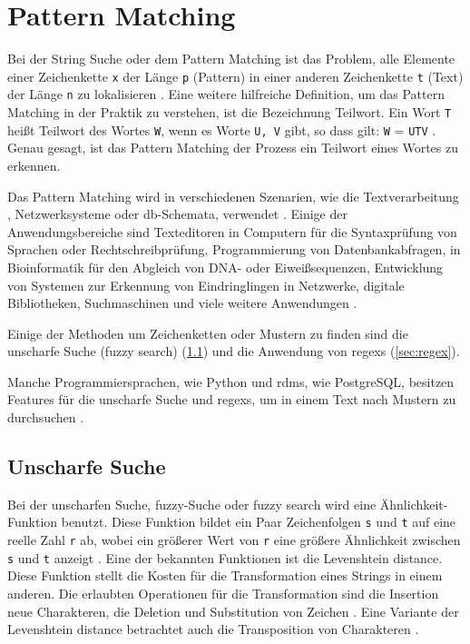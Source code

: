 \section{Pattern Matching} \label{subsec:pattmatch}

Bei der String Suche oder dem Pattern Matching ist das Problem, alle Elemente einer Zeichenkette \texttt{x} der Länge \texttt{p} (Pattern) in einer anderen Zeichenkette \texttt{t} (Text) der Länge \texttt{n} zu lokalisieren \cite{patternmatchingapostolico}. Eine weitere hilfreiche Definition, um das Pattern Matching in der Praktik zu verstehen, ist die Bezeichnung \glqq Teilwort\grqq{}. \glqq Ein Wort \texttt{T} heißt Teilwort des Wortes \texttt{W}, wenn es Worte \texttt{U, V} gibt, so dass gilt: \texttt{W} = \texttt{UTV}\grqq{} \cite{teilwort}. Genau gesagt, ist das Pattern Matching der Prozess ein Teilwort eines Wortes zu erkennen.

Das Pattern Matching wird in verschiedenen Szenarien, wie die Textverarbeitung \cite{patternmatchingeffi}, Netzwerksysteme oder \ac{db}-Schemata, verwendet \cite{patternmatchingapps}. Einige der Anwendungsbereiche sind Texteditoren in Computern für die Syntaxprüfung von Sprachen oder Rechtschreibprüfung, Programmierung von Datenbankabfragen, in Bioinformatik für den Abgleich von DNA- oder Eiweißsequenzen, Entwicklung von Systemen zur Erkennung von Eindringlingen in Netzwerke, digitale Bibliotheken, Suchmaschinen und viele weitere Anwendungen \cite{regexconf, patternmatchingapps}.

Einige der Methoden um Zeichenketten oder Mustern zu finden sind die unscharfe Suche (fuzzy search) (\ref{sub:levdist}) und die Anwendung von \acp{regex} (\ref{sec:regex}).

Manche Programmiersprachen, wie Python und \ac{rdms}, wie PostgreSQL, besitzen Features für die unscharfe Suche und \acp{regex}, um in einem Text nach Mustern zu durchsuchen \cite{thefuzzlib, patternmatchingpostgres}.

\subsection{Unscharfe Suche} \label{sub:levdist}

Bei der unscharfen Suche, fuzzy-Suche oder fuzzy search wird eine Ähnlichkeit-Funktion benutzt. Diese Funktion bildet ein Paar Zeichenfolgen \texttt{s} und \texttt{t} auf eine reelle Zahl \texttt{r} ab, wobei ein größerer Wert von \texttt{r} eine größere Ähnlichkeit zwischen \texttt{s} und \texttt{t} anzeigt \cite{stringsearch2}. Eine der bekannten Funktionen ist die \glqq Levenshtein distance\grqq{}. Diese Funktion stellt die Kosten für die Transformation eines Strings in einem anderen. Die erlaubten Operationen für die Transformation sind die Insertion neue Charakteren, die Deletion und Substitution von Zeichen \cite{stringsearch2}. Eine Variante der \glqq Levenshtein distance\grqq{} betrachtet auch die Transposition von Charakteren \cite{thefuzzyalgo}.

